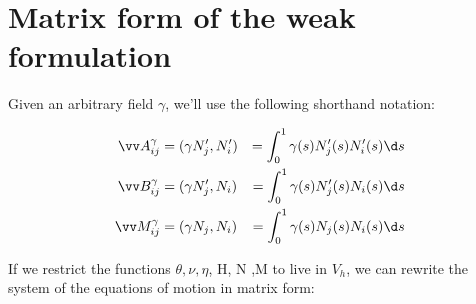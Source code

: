 

\section{Matrix form of the weak
formulation}\label{matrix-form-of-the-weak-formulation}
Given an arbitrary field $\gamma$, we’ll use the following shorthand notation:

\begin{equation}
  \label{eq:2}
  \begin{aligned}
    \vv A^\gamma_{ij} & = (\gamma N_j', N_i') &  = \int_0^1 \gamma(s) N_j'(s)
    N_i'(s) \d s \\
    \vv B^\gamma_{ij} & = (\gamma N_j', N_i) & = \int_0^1 \gamma(s) N_j'(s)
    N_i(s) \d s \\
    \vv M^\gamma_{ij} & = (\gamma N_j, N_i) & = \int_0^1 \gamma(s) N_j(s)
    N_i(s) \d s 
  \end{aligned}
\end{equation}

If we restrict the functions $\theta, \nu, \eta$, H, N ,M to live in $V_h$, we
can rewrite the system of the equations of motion in matrix form:


